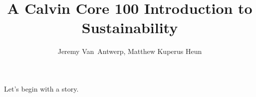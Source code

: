 \documentclass{article}\usepackage[]{graphicx}\usepackage[table]{xcolor}
\begin{document}
\title{A Calvin Core 100 Introduction to Sustainability}
\author{Jeremy Van~Antwerp, Matthew Kuperus Heun}
\maketitle
 
Let’s begin with a story.
% 
% 
% 
\end{document}
